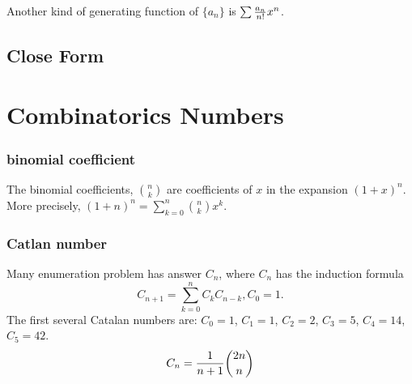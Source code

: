 Another kind of generating function of $\{a_n\}$ is $\sum {a_n\over n!} x^n$.

\subsection{Close Form}


\section{Combinatorics Numbers}
\subsubsection{binomial coefficient}
The binomial coefficients, $n\choose k$ are coefficients of $x$ in the expansion $(1+x)^n$.
More precisely, $(1+n)^n=\sum_{k=0}^n {n\choose k}x^k$.

\subsubsection{Catlan number}
Many enumeration problem has answer $C_n$,
where $C_n$ has the induction formula
$$C_{n+1} = \sum_{k=0}^n C_k C_{n-k}, C_0=1.$$
The first several Catalan numbers are:
$C_0=1$, $C_1=1$, $C_2=2$, $C_3=5$, $C_4=14$, $C_5=42$.
$$C_n={1 \over {n + 1}} {2n \choose n}$$

